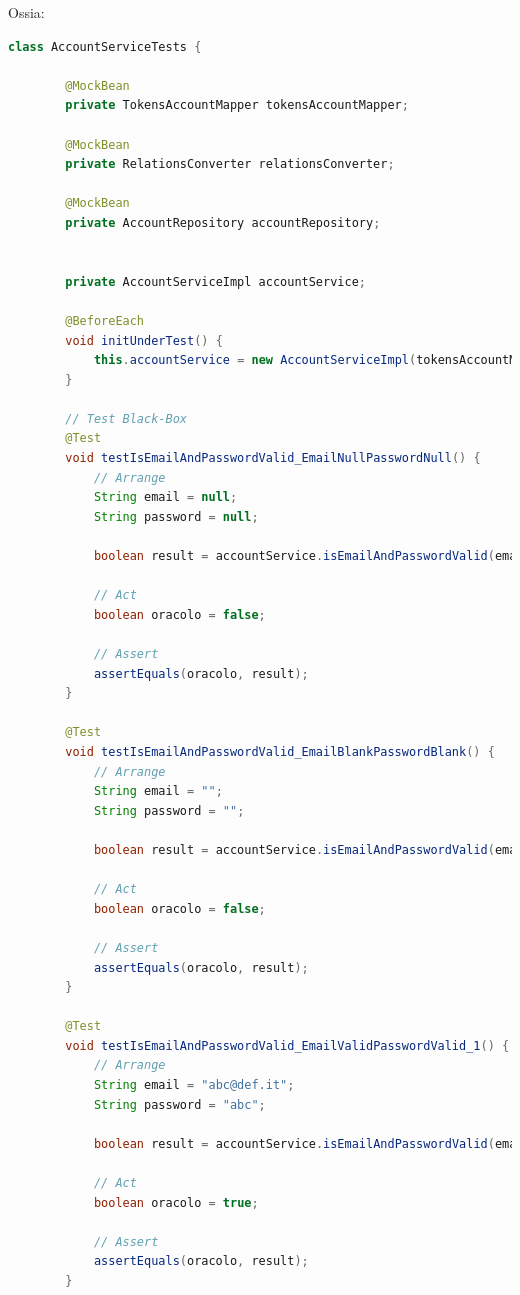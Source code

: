             Ossia:

            \begin{lstlisting}[language=Java, caption=AccountServiceTests.java]
    class AccountServiceTests {
    
        @MockBean
        private TokensAccountMapper tokensAccountMapper;
    
        @MockBean
        private RelationsConverter relationsConverter;
    
        @MockBean
        private AccountRepository accountRepository;
    
    
        private AccountServiceImpl accountService;
    
        @BeforeEach
        void initUnderTest() {
            this.accountService = new AccountServiceImpl(tokensAccountMapper, relationsConverter, accountRepository);
        }
    
        // Test Black-Box
        @Test
        void testIsEmailAndPasswordValid_EmailNullPasswordNull() {
            // Arrange
            String email = null;
            String password = null;
    
            boolean result = accountService.isEmailAndPasswordValid(email, password);
    
            // Act
            boolean oracolo = false;
    
            // Assert
            assertEquals(oracolo, result);
        }
    
        @Test
        void testIsEmailAndPasswordValid_EmailBlankPasswordBlank() {
            // Arrange
            String email = "";
            String password = "";
    
            boolean result = accountService.isEmailAndPasswordValid(email, password);
    
            // Act
            boolean oracolo = false;
    
            // Assert
            assertEquals(oracolo, result);
        }
    
        @Test
        void testIsEmailAndPasswordValid_EmailValidPasswordValid_1() {
            // Arrange
            String email = "abc@def.it";
            String password = "abc";
    
            boolean result = accountService.isEmailAndPasswordValid(email, password);
    
            // Act
            boolean oracolo = true;
    
            // Assert
            assertEquals(oracolo, result);
        }
    

\end{lstlisting}
